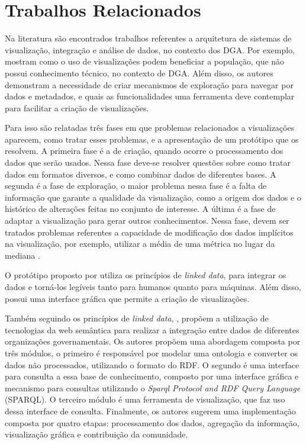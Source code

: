 
\chapter{Trabalhos Relacionados}
\label{chap:trabRelac}

Na literatura são encontrados trabalhos referentes a arquitetura de sistemas de visualização,
integração e análise de dados, no contexto dos DGA.  Por exemplo,  
mostram como o uso de visualizações podem beneficiar a população, que não possui conhecimento 
técnico, no contexto de DGA. Além disso, os autores demonstram a necessidade de criar 
mecanismos de exploração para navegar por dados e metadados, e quais as funcionalidades uma 
ferramenta deve contemplar para facilitar a criação de visualizações.

Para isso são relatadas três fases em que problemas relacionados a visualizações aparecem, 
como tratar esses problemas, e a apresentação de um protótipo que os resolvem. A primeira fase 
é a de criação, quando ocorre o processamento dos dados que serão usados. Nessa fase deve-se 
resolver questões sobre como tratar dados em formatos diversos, e como combinar dados de 
diferentes bases. A segunda é a fase de exploração, o maior problema nessa fase é a falta de 
informação que garante a qualidade da visualização, como a origem dos dados e o histórico de 
alterações feitas no conjunto de interesse. A última é a fase de adaptar a visualização para 
gerar outros conhecimentos. Nessa fase, devem ser tratados problemas referentes a capacidade 
de modificação dos dados implícitos na visualização, por exemplo, utilizar a média de uma 
métrica no lugar da mediana \cite{graves2013}.

O protótipo proposto por  utiliza os princípios de \textit{linked data}, 
para integrar os dados e torná-los legíveis tanto para humanos quanto para máquinas. Além 
disso, possui uma interface gráfica que permite a criação de visualizações.

Também seguindo os princípios de \textit{linked data}, , propõem a 
utilização de  tecnologias da web semântica para realizar a integração entre dados de 
diferentes organizações governamentais. Os autores propõem uma abordagem composta por três 
módulos, o primeiro é responsável por modelar uma ontologia e converter os dados não 
processados, utilizando o formato do RDF. O segundo é uma interface para consulta a essa base 
de conhecimento, composto por uma interface gráfica e mecanismo para consultas utilizando o 
\textit{Sparql Protocol and RDF Query Language} (SPARQL). O terceiro módulo é uma ferramenta 
de visualização, que faz uso dessa interface de consulta.  Finalmente, os autores sugerem uma 
implementação composta por quatro etapas: processamento dos dados, agregação da informação, 
visualização gráfica e contribuição da comunidade.

